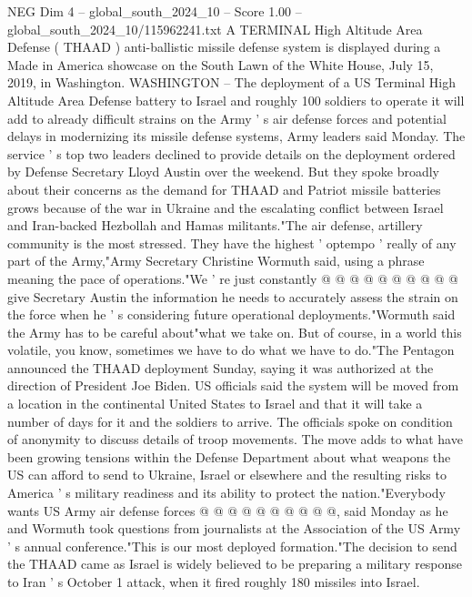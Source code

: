 \begin{textsample}{NEG Dim 4 – global\_south\_2024\_10 – Score 1.00 – global\_south\_2024\_10/115962241.txt}  \label{ex:f4_neg_062}
A TERMINAL High Altitude Area Defense ( THAAD ) anti-ballistic missile defense system is displayed during a Made in America showcase on the South Lawn of the White House, July 15, 2019, in Washington.
WASHINGTON -- The deployment of a US Terminal High Altitude Area Defense battery to Israel and roughly 100 soldiers to operate it will add to already difficult strains on the Army ' s air defense forces and potential delays in modernizing its missile defense systems, Army leaders said Monday.
The service ' s top two leaders declined to provide details on the deployment ordered by Defense Secretary Lloyd Austin over the weekend.
But they spoke broadly about their concerns as the demand for THAAD and Patriot missile batteries grows because of the war in Ukraine and the escalating conflict between Israel and Iran-backed Hezbollah and Hamas militants."The air defense, artillery community is the most stressed.
They have the highest ' optempo ' really of any part of the Army,"Army Secretary Christine Wormuth said, using a phrase meaning the pace of operations."We ' re just constantly @ @ @ @ @ @ @ @ @ @ give Secretary Austin the information he needs to accurately assess the strain on the force when he ' s considering future operational deployments."Wormuth said the Army has to be careful about"what we take on.
But of course, in a world this volatile, you know, sometimes we have to do what we have to do."The Pentagon announced the THAAD deployment Sunday, saying it was authorized at the direction of President Joe Biden.
US officials said the system will be moved from a location in the continental United States to Israel and that it will take a number of days for it and the soldiers to arrive.
The officials spoke on condition of anonymity to discuss details of troop movements.
The move adds to what have been growing tensions within the Defense Department about what weapons the US can afford to send to Ukraine, Israel or elsewhere and the resulting risks to America ' s military readiness and its ability to protect the nation."Everybody wants US Army air defense forces @ @ @ @ @ @ @ @ @ @, said Monday as he and Wormuth took questions from journalists at the Association of the US Army ' s annual conference."This is our most deployed formation."The decision to send the THAAD came as Israel is widely believed to be preparing a military response to Iran ' s October 1 attack, when it fired roughly 180 missiles into Israel.

\end{textsample}
